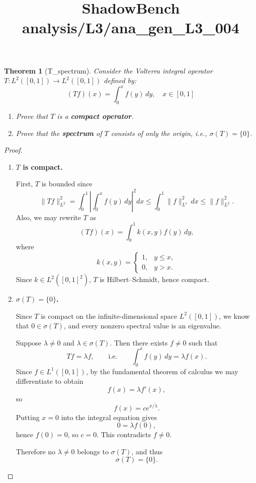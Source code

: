 \documentclass{article}
\title{ShadowBench analysis/L3/ana\_gen\_L3\_004}
\newtheorem{theorem}{Theorem}
\begin{document}
\maketitle

\begin{theorem}[T_spectrum]
Consider the \textit{Volterra integral operator} $T : L^2([0, 1]) \to L^2([0, 1])$ defined by:
\begin{equation*}
    (Tf)(x) = \int_0^x f(y) \, dy, \quad x \in [0, 1]
\end{equation*}

\begin{enumerate}
    \item Prove that $T$ is a \textbf{compact operator}.
    \item Prove that the \textbf{spectrum} of $T$ consists of only the origin, i.e., $\sigma(T) = \{0\}$.
\end{enumerate}
\end{theorem}

\begin{proof}
\begin{enumerate}
\item \textbf{$T$ is compact.}

First, $T$ is bounded since
\[
\|Tf\|_{L^2}^2
=
\int_0^1 \left|\int_0^x f(y)\,dy\right|^2 dx
\le
\int_0^1 \|f\|_{L^1}^2\,dx
\le
\|f\|_{L^2}^2.
\]
Also, we may rewrite $T$ as
\[
(Tf)(x)=\int_0^1 k(x,y)f(y)\,dy,
\]
where
\[
k(x,y)=
\begin{cases}
1,& y\le x,\\
0,& y>x.
\end{cases}
\]
Since $k\in L^2([0,1]^2)$, $T$ is Hilbert--Schmidt, hence compact.

\item \textbf{$\sigma(T)=\{0\}$.}

Since $T$ is compact on the infinite-dimensional space $L^2([0,1])$, we know that
$0\in \sigma(T)$, and every nonzero spectral value is an eigenvalue.

Suppose $\lambda\ne 0$ and $\lambda\in \sigma(T)$. Then there exists $f\ne 0$ such that
\[
Tf=\lambda f,
\qquad\text{i.e.}\qquad
\int_0^x f(y)\,dy=\lambda f(x).
\]
Since $f\in L^1([0,1])$, by the fundamental theorem of calculus we may differentiate to obtain
\[
f(x)=\lambda f'(x),
\]
so
\[
f(x)=ce^{x/\lambda}.
\]
Putting $x=0$ into the integral equation gives
\[
0=\lambda f(0),
\]
hence $f(0)=0$, so $c=0$. This contradicts $f\ne 0$.

Therefore no $\lambda\ne 0$ belongs to $\sigma(T)$, and thus
\[
\sigma(T)=\{0\}.
\]
\end{enumerate}
\end{proof}
\end{document}
